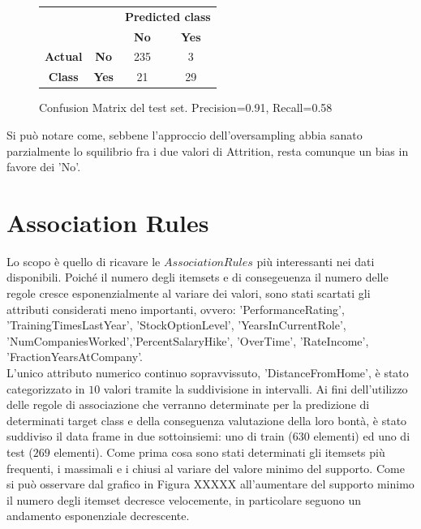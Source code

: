 \documentclass[a4paper,9pt]{article}
\begin{document}
\begin{figure}[H]
    \centering
\begin{tabular}{cc|cc}
\toprule
&\bfseries      & \multicolumn{2}{c}{\bfseries Predicted class} \\
& & \bfseries No & \bfseries Yes \\
\midrule
\bfseries Actual&\bfseries No  & 235 & 3  \\
\bfseries Class &\bfseries Yes & 21 & 29  \\
\bottomrule
\end{tabular}
\caption{Confusion Matrix del test set. Precision=0.91, Recall=0.58}
\end{figure}
Si può notare come, sebbene l'approccio dell'oversampling abbia sanato parzialmente lo squilibrio fra i due valori di Attrition, resta comunque un bias in favore dei 'No'.

\section{Association Rules}
Lo scopo è quello di ricavare le $Association Rules$ più interessanti nei dati disponibili. Poiché il numero degli itemsets e di consegeuenza il numero delle regole cresce esponenzialmente al variare dei valori, sono stati scartati gli attributi considerati meno importanti, ovvero:
'PerformanceRating', 'TrainingTimesLastYear', 'StockOptionLevel',  'YearsInCurrentRole',  'NumCompaniesWorked','PercentSalaryHike',  'OverTime',  'RateIncome', 'FractionYearsAtCompany'.\\
L'unico attributo numerico continuo sopravvissuto, 'DistanceFromHome', è stato categorizzato in $10$ valori tramite la suddivisione in intervalli.
Ai fini dell'utilizzo delle regole di associazione che verranno determinate per la predizione di determinati target class e della conseguenza valutazione della loro bontà, è stato suddiviso il data frame in due sottoinsiemi: uno di train ($630$ elementi) ed uno di test ($269$ elementi).
Come prima cosa sono stati determinati gli itemsets più frequenti, i massimali e i chiusi al variare del valore minimo del supporto. Come si può osservare dal grafico in Figura XXXXX all'aumentare del supporto minimo il numero degli itemset decresce velocemente, in particolare seguono un andamento esponenziale decrescente.
\end{document}
